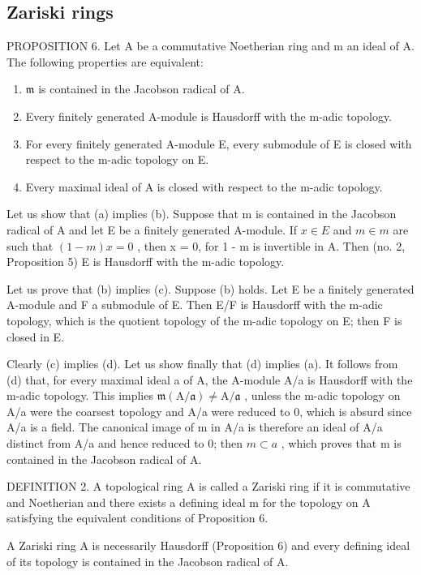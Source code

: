 \subsection{Zariski rings}

PROPOSITION 6. Let A be a commutative Noetherian ring and m an ideal of A. The following properties are equivalent:

\begin{enumerate}
\def\labelenumi{(\alph{enumi})}
\item
  \(\mathfrak{m}\) is contained in the Jacobson radical of A.
\item
  Every finitely generated A-module is Hausdorff with the m-adic topology.
\item
  For every finitely generated A-module E, every submodule of E is closed with respect to the m-adic topology on E.
\item
  Every maximal ideal of A is closed with respect to the m-adic topology.
\end{enumerate}

Let us show that (a) implies (b). Suppose that m is contained in the Jacobson radical of A and let E be a finitely generated A-module. If \(x \in E\) and \(m \in m\) are such that \((1 - m)x = 0\) , then x = 0, for 1 - m is invertible in A. Then (no. 2, Proposition 5) E is Hausdorff with the m-adic topology.

Let us prove that (b) implies (c). Suppose (b) holds. Let E be a finitely generated A-module and F a submodule of E. Then E/F is Hausdorff with the m-adic topology, which is the quotient topology of the m-adic topology on E; then F is closed in E.

Clearly (c) implies (d). Let us show finally that (d) implies (a). It follows from (d) that, for every maximal ideal a of A, the A-module A/a is Hausdorff with the m-adic topology. This implies \(\mathfrak{m}(\mathrm{A}/\mathfrak{a}) \neq \mathrm{A}/\mathfrak{a}\) , unless the m-adic topology on A/a were the coarsest topology and A/a were reduced to 0, which is absurd since A/a is a field. The canonical image of m in A/a is therefore an ideal of A/a distinct from A/a and hence reduced to 0; then \(m \subset a\) , which proves that m is contained in the Jacobson radical of A.

DEFINITION 2. A topological ring A is called a Zariski ring if it is commutative and Noetherian and there exists a defining ideal m for the topology on A satisfying the equivalent conditions of Proposition 6.

A Zariski ring A is necessarily Hausdorff (Proposition 6) and every defining ideal of its topology is contained in the Jacobson radical of A.

